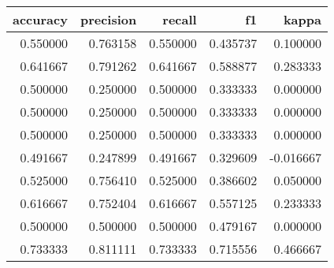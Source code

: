 \begin{tabular}{rrrrr}
\toprule
accuracy & precision & recall & f1 & kappa \\
\midrule
0.550000 & 0.763158 & 0.550000 & 0.435737 & 0.100000 \\
0.641667 & 0.791262 & 0.641667 & 0.588877 & 0.283333 \\
0.500000 & 0.250000 & 0.500000 & 0.333333 & 0.000000 \\
0.500000 & 0.250000 & 0.500000 & 0.333333 & 0.000000 \\
0.500000 & 0.250000 & 0.500000 & 0.333333 & 0.000000 \\
0.491667 & 0.247899 & 0.491667 & 0.329609 & -0.016667 \\
0.525000 & 0.756410 & 0.525000 & 0.386602 & 0.050000 \\
0.616667 & 0.752404 & 0.616667 & 0.557125 & 0.233333 \\
0.500000 & 0.500000 & 0.500000 & 0.479167 & 0.000000 \\
0.733333 & 0.811111 & 0.733333 & 0.715556 & 0.466667 \\
\bottomrule
\end{tabular}
